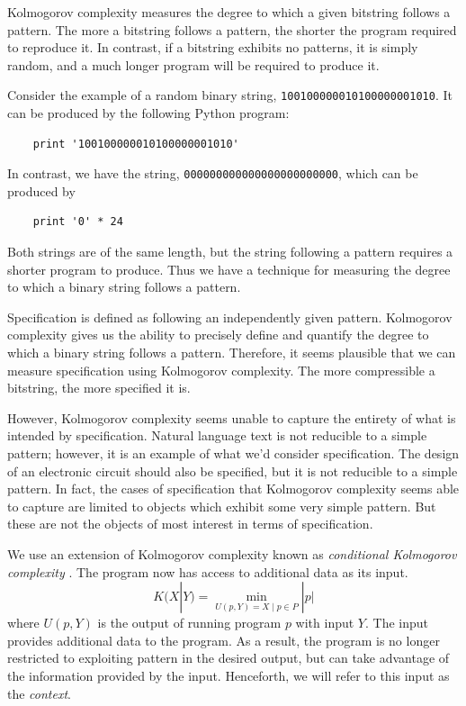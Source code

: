 Kolmogorov complexity measures the degree to which a given bitstring follows a pattern.
The more a bitstring follows a pattern, the shorter the program required to reproduce it.
In contrast, if a bitstring exhibits no patterns, it is simply random, and a much longer program will be required to produce it.

Consider the example of a random binary string, {\tt 100100000010100000001010}.
It can be produced by the following Python program:
\begin{verbatim}
    print '100100000010100000001010'
\end{verbatim}
In contrast, we have the string, {\tt 000000000000000000000000}, which can be produced by
\begin{verbatim}
    print '0' * 24
\end{verbatim}
Both strings are of the same length, but the string following a pattern requires a shorter program to produce.
Thus we have a technique for measuring the degree to which a binary string follows a pattern.

Specification is defined as following an independently given pattern.
Kolmogorov complexity gives us the ability to precisely define and quantify the degree to which a binary string follows a pattern.
Therefore, it seems plausible that we can measure specification using Kolmogorov complexity.
The more compressible a bitstring, the more specified it is.

However, Kolmogorov complexity seems unable to capture the entirety of what is intended by specification.
Natural language text is not reducible to a simple pattern; however, it is an example of what we'd consider specification.
The design of an electronic circuit should also be specified, but it is not reducible to a simple pattern.
In fact, the cases of specification that Kolmogorov complexity seems able to capture are limited to objects which exhibit some very simple pattern.
But these are not the objects of most interest in terms of specification.

We use an extension of Kolmogorov complexity known as {\it conditional Kolmogorov complexity} \citep{Kolmogorov1968}.
The program now has access to additional data as its input.
\begin{equation}
    K(X|Y) = \min_{U(p,Y) = X \mid p \in P} |p|
\end{equation} where $U(p,Y)$ is the output of running program $p$ with input $Y$.
The input provides additional data to the program.
As a result, the program is no longer restricted to exploiting pattern in the desired output, but can take advantage of the information provided by the input.
Henceforth, we will refer to this input as the {\it context}.

